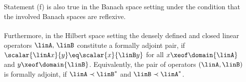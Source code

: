 \documentclass[11pt,twoside]{article}
\begin{document}
\begin{theorem1}
\begin{itemize}[leftmargin=25pt]

\end{itemize}
\end{theorem1}

\subparagraph{}
Statement (f) is also true in the Banach space setting
under the condition that the involved Banach spaces are reflexive.

\paragraph{} %
Furthermore,
in the Hilbert space setting the densely defined and closed linear operators
$\linA,\,\linB$ constitute a formally adjoint pair,
if $\scalar{\linA x}{y} \eq \scalar{x}{\linB y}$
for all $x \xeof \domain{\linA}$
and $y \xeof \domain{\linB}$.
Equivalently,
the pair of operators $(\linA,\linB)$ is formally adjoint,
if $\linA \prec \linB^*$ and $\linB \prec \linA^*$.
\end{document}
